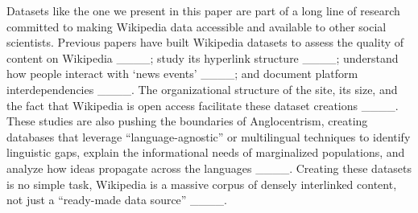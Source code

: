 Datasets like the one we present in this paper are part of a long line of research committed to making Wikipedia data accessible and available to other social scientists. Previous papers have built Wikipedia datasets to assess the quality of content on Wikipedia ____; study its hyperlink structure ____; understand how people interact with ‘news events’ ____; and document platform interdependencies ____. The organizational structure of the site, its size, and the fact that Wikipedia is open access facilitate these dataset creations ____. These studies are also pushing the boundaries of Anglocentrism, creating databases that leverage ``language-agnostic'' or multilingual techniques to identify linguistic gaps, explain the informational needs of marginalized populations, and analyze how ideas propagate across the languages ____. Creating these datasets is no simple task, Wikipedia is a massive corpus of densely interlinked content, not just a ``ready-made data source'' ____. 

